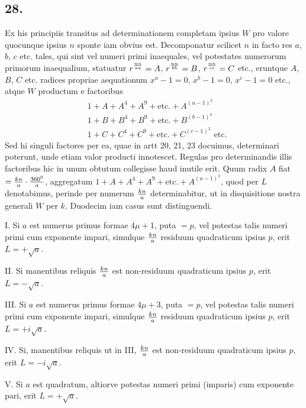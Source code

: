 \documentclass[twoside,12pt]{memoir}
\let\oldfrac\frac
\def\frac#1#2{\mathchoice{\tfrac{#1}{#2}}{\oldfrac{#1}{#2}}{\genfrac{}{}{}{2}{#1}{#2\mathstrut}}{\genfrac{}{}{}{3}{#1}{#2\mathstrut}}}
\begin{document}
\subsection*{28.}
 
Ex his principiis transitus ad determinationem completam ipsius \(W\) pro valore quocunque ipsius \(n\) sponte iam obvius est. Decomponatur scilicet \(n\) in facto\pagebreak%
res \(a\), \(b\), \(c\) etc. tales, qui sint vel numeri primi inaequales, vel potestates numerorum primorum inaequalium, statuatur \(r^{\frac{n n}{a a}}=A\), \(r^{\frac{n n}{b b}}=B\), \(r^{\frac{n n}{c c}}=C\) etc., eruntque \(A\), \(B\), \(C\) etc. radices propriae aequationum \(x^{a}-1=0\), \(x^{b}-1=0\), \(x^{c}-1=0\) etc., atque \(W\) productum e factoribus
\[\begin{aligned}
& 1+A+A^{4}+A^{9}+\text{etc.}+A^{(u-1)^{2}} \\
& 1+B+B^{4}+B^{9}+\text{etc.}+B^{(b-1)^{2}} \\
& 1+C+C^{4}+C^{9}+\text{etc.}+C^{(c-1)^{2}} \text{ etc.}
\end{aligned}\]
Sed hi singuli factores per ea, quae in artt 20, 21, 23 docuimus, determinari poterunt, unde etiam valor producti innotescet. Regulas pro determinandis illis factoribus hic in unum obtutum collegisse haud inutile erit. Quum radix \(A\) fiat \(=\frac{k n}{a} \cdot \frac{360^{0}}{a}\), aggregatum \(1+A+A^{4}+A^{9}+\text{etc.}+A^{(a-1)^{2}}\), quod per \(L\) denotabimus, perinde per numerum \(\frac{k n}{a}\) determinabitur, ut in disquisitione nostra generali \({W}\) per \(k\). Duodecim iam casus sunt distinguendi.
 
I. Si \(a\) est numerus primus formae \(4 \mu+1\), puta \(=p\), vel potestas talis numeri primi cum exponente impari, simulque \(\frac{k n}{a}\) residuum quadraticum ipsius \(p\), erit \(L=+\surd a\).
 
II. Si manentibus reliquis \(\frac{k n}{a}\) est non-residuum quadraticum ipsius \(p\), erit \(L=-\surd a\).
 
III. Si \(a\) est numerus primus formae \(4 \mu+3\), puta \(=p\), vel potestas talis numeri primi cum exponente impari, simulque \(\frac{k n}{a}\) residuum quadraticum ipsius \(p\), erit \(L=+i \surd a\).
 
IV. Si, manentibus reliquis ut in III, \(\frac{k n}{a}\) est non-residuum quadraticum ipsius \(p\), erit \(L=-i \surd a\).
 
V. Si \(a\) est quadratum, altiorve potestas numeri primi (imparis) cum exponente pari, erit \(L=+\surd a\).
 
\end{document}
